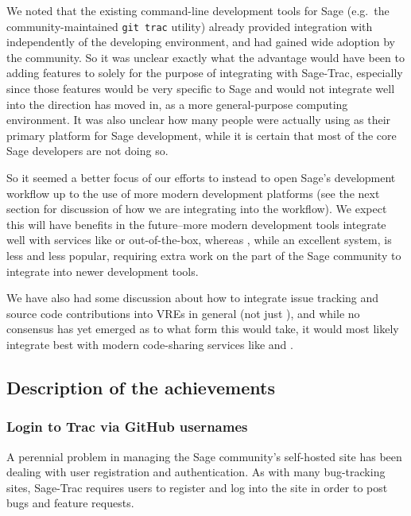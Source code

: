 We noted that the existing command-line development tools for Sage
(e.g.~the community-maintained {\tt git trac} utility) already
provided integration with \Trac independently of the developing
environment, and had gained wide adoption by the community. So it was
unclear exactly what the advantage
would have been to adding features to \cocalc solely for the purpose of
integrating with Sage-Trac, especially since those features would be very
specific to Sage and would not integrate well into the direction \cocalc has
moved in, as a more general-purpose computing environment.
It was also unclear how many people were actually using \cocalc as their
primary platform for Sage development, while it is certain that most of the
core Sage developers are not doing so.


So it seemed a better focus of our
efforts to instead to open Sage's development workflow up to the use of more
modern development platforms (see the next section for discussion of how we are
integrating \GitLab into the workflow).  We expect this will have benefits in
the future--more modern development tools integrate well with services like
\GitHub or \GitLab out-of-the-box, whereas \Trac, while an excellent system, is
less and less popular, requiring extra work on the part of the Sage community
to integrate into newer development tools.

We have also had some discussion about how to integrate issue tracking and
source code contributions into VREs in general (not just \cocalc), and while no
consensus has yet emerged as to what form this would take, it would most likely
integrate best with modern code-sharing services like \GitHub and \GitLab.


\hypertarget{description-of-the-achievements}{%
\subsection{Description of the
achievements}\label{description-of-the-achievements}}

\hypertarget{trac-github-login}{%
\subsubsection{Login to Trac via GitHub usernames}\label{trac-github-login}}
A perennial problem in managing the Sage community's self-hosted \Trac site has
been dealing with user registration and authentication.  As with many
bug-tracking sites, Sage-Trac requires users to register and log into the site
in order to post bugs and feature requests.

